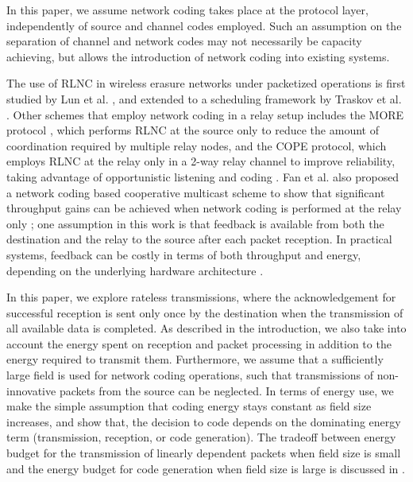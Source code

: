 \documentclass[journal, letterpaper]{IEEEtran}
\begin{document}
In this paper, we assume network coding takes place at the protocol layer, independently of source and channel codes employed. Such an assumption on the separation of channel and network codes may not necessarily be capacity achieving, but allows the introduction of network coding into existing systems.

The use of RLNC in wireless erasure networks under packetized operations is first studied by Lun et al. \cite{lun2008coding}, and extended to a scheduling framework by Traskov et al. \cite{traskovThesis}. Other schemes that employ network coding in a relay setup includes the MORE protocol \cite{chachulski2007trading}, which performs RLNC at the source only to reduce the amount of coordination required by multiple relay nodes, and the COPE protocol, which employs RLNC at the relay only in a 2-way relay channel to improve reliability, taking advantage of opportunistic listening and coding \cite{katti2006xors}. Fan et al. also proposed a network coding based cooperative multicast scheme to show that significant throughput gains can be achieved when network coding is performed at the relay only \cite{fan2009reliable}; one assumption in this work is that feedback is available from both the destination and the relay to the source after each packet reception. In practical systems, feedback can be costly in terms of both throughput and energy, depending on the underlying hardware architecture \cite{shi2011both}.

In this paper, we explore rateless transmissions, where the acknowledgement for successful reception is sent only once by the destination when the transmission of all available data is completed. As described in the introduction, we also take into account the energy spent on reception and packet processing in addition to the energy required to transmit them. Furthermore, we assume that a sufficiently large field is used for network coding operations, such that transmissions of non-innovative packets from the source can be neglected. In terms of energy use, we make the simple assumption that coding energy stays constant as field size increases, and show that, the decision to code depends on the dominating energy term (transmission, reception, or code generation). The tradeoff between energy budget for the transmission of linearly dependent packets when field size is small and the energy budget for code generation when field size is large is discussed in \cite{angelopoulos2011energy}.
\end{document}
